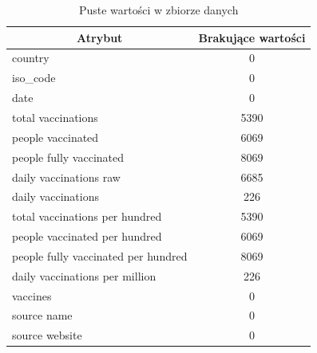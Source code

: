 \documentclass[12pt, oneside, openany]{article}
\begin{document}
\begin{table}[h]

\centering
\begin{tabular}{|l|c|}
\hline
\multicolumn{1}{|c|}{\textbf{Atrybut}} & \textbf{Brakujące wartości} \\ \hline
country                                & 0                           \\ \hline
iso\_code                              & 0                           \\ \hline
date                                   & 0                           \\ \hline
total vaccinations                     & 5390                        \\ \hline
people vaccinated                      & 6069                        \\ \hline
people fully vaccinated                & 8069                        \\ \hline
daily vaccinations raw                 & 6685                        \\ \hline
daily vaccinations                     & 226                         \\ \hline
total vaccinations per hundred         & 5390                        \\ \hline
people vaccinated per hundred          & 6069                        \\ \hline
people fully vaccinated per hundred    & 8069                        \\ \hline
daily vaccinations per million         & 226                         \\ \hline
vaccines                               & 0                           \\ \hline
source name                            & 0                           \\ \hline
source website                         & 0                           \\ \hline
\end{tabular}
\caption{Puste wartości w zbiorze danych}
\label{Tab:Tcr}
\end{table}
\end{document}
